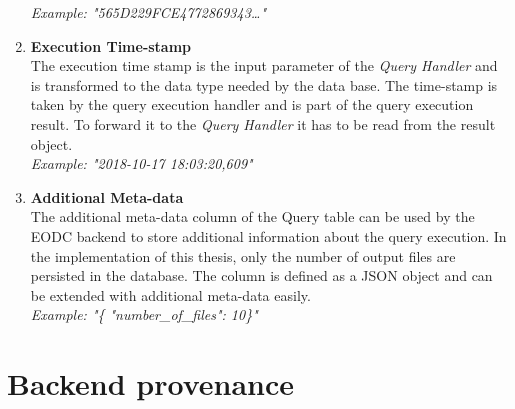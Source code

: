 \documentclass[draft,final]{vutinfth} %
\begin{document}
\begin{enumerate}
	\textit{Example: "565D229FCE4772869343\dots"} 
	\item \textbf{Execution Time-stamp} \\
	The execution time stamp is the input parameter of the \textit{Query Handler} and is transformed to the data type needed by the data base. The time-stamp is taken by the query execution handler and is part of the query execution result. To forward it to the \textit{Query Handler} it has to be read from the result object. \\
	\textit{Example: "2018-10-17 18:03:20,609"}  
	\item \textbf{Additional Meta-data} \\
	The additional meta-data column of the Query table can be used by the EODC backend to store additional information about the query execution. In the implementation of this thesis, only the number of output files are persisted in the database. The column is defined as a JSON object and can be extended with additional meta-data easily. \\
	\textit{Example: "\{ "number\_of\_files": 10\}"}    	 
\end{enumerate}


\section{Backend provenance}\label{Implementation:Backend provenance}
\end{document}
